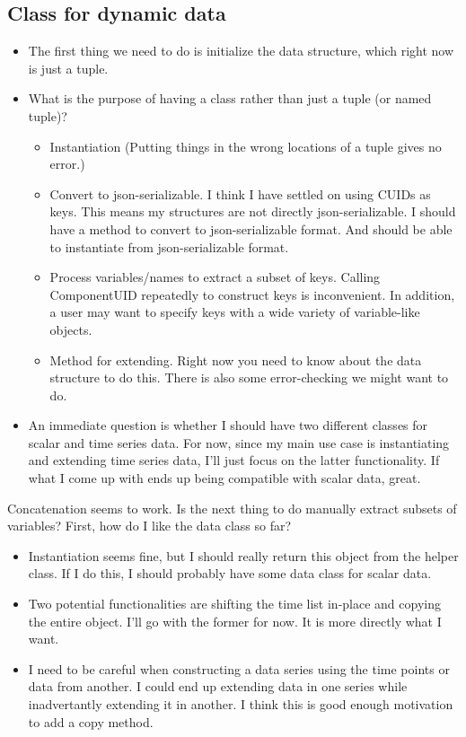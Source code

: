 \documentclass{article}
\begin{document}
\subsection{Class for dynamic data}
\begin{itemize}
  \item The first thing we need to do is initialize the data structure, which
    right now is just a tuple.
  \item What is the purpose of having a class rather than just a tuple
    (or named tuple)?
    \begin{itemize}
      \item Instantiation (Putting things in the wrong locations of a tuple
	gives no error.)
      \item Convert to json-serializable. I think I have settled on using CUIDs
	as keys. This means my structures are not directly json-serializable.
	I should have a method to convert to json-serializable format.
	And should be able to instantiate from json-serializable format.
      \item Process variables/names to extract a subset of keys.
	Calling ComponentUID repeatedly to construct keys is inconvenient.
	In addition, a user may want to specify keys with a wide variety
	of variable-like objects.
      \item Method for extending. Right now you need to know about the data
	structure to do this. There is also some error-checking we might
	want to do.
    \end{itemize}
  \item An immediate question is whether I should have two different classes
    for scalar and time series data. For now, since my main use case is
    instantiating and extending time series data, I'll just focus on the latter
    functionality. If what I come up with ends up being compatible with
    scalar data, great.
\end{itemize}
Concatenation seems to work. Is the next thing to do manually extract subsets
of variables?
First, how do I like the data class so far?
\begin{itemize}
  \item Instantiation seems fine, but I should really return this object
    from the helper class. If I do this, I should probably have some data
    class for scalar data.
  \item Two potential functionalities are shifting the time list in-place
    and copying the entire object.
    I'll go with the former for now. It is more directly what I want.
  \item I need to be careful when constructing a data series using the time
    points or data from another. I could end up extending data in one series
    while inadvertantly extending it in another.
    I think this is good enough motivation to add a copy method.
\end{itemize}
\end{document}
